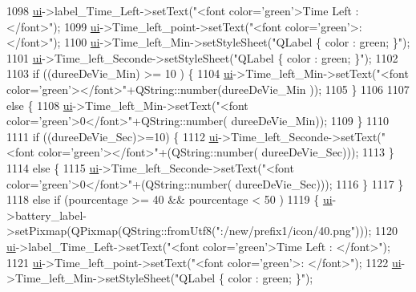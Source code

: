 \begin{DoxyCode}
{1098               \hyperlink{a00008_a6dc041ef6a2ffb329928d2913e8344e6}{ui}->label\_Time\_Left->setText(\textcolor{stringliteral}{"<font color='green'>Time Left : </font>"});
1099               \hyperlink{a00008_a6dc041ef6a2ffb329928d2913e8344e6}{ui}->Time\_left\_point->setText(\textcolor{stringliteral}{"<font color='green'>: </font>"});
1100               \hyperlink{a00008_a6dc041ef6a2ffb329928d2913e8344e6}{ui}->Time\_left\_Min->setStyleSheet(\textcolor{stringliteral}{"QLabel \{ color : green; \}"});
1101               \hyperlink{a00008_a6dc041ef6a2ffb329928d2913e8344e6}{ui}->Time\_left\_Seconde->setStyleSheet(\textcolor{stringliteral}{"QLabel \{ color : green; \}"});
1102 
1103               \textcolor{keywordflow}{if} ((dureeDeVie\_Min) >=  10 ) \{
1104                   \hyperlink{a00008_a6dc041ef6a2ffb329928d2913e8344e6}{ui}->Time\_left\_Min->setText(\textcolor{stringliteral}{"<font color='green'></font>"}+QString::number(dureeDeVie\_Min
      ));
1105               \}
1106 
1107               \textcolor{keywordflow}{else} \{
1108                   \hyperlink{a00008_a6dc041ef6a2ffb329928d2913e8344e6}{ui}->Time\_left\_Min->setText(\textcolor{stringliteral}{"<font color='green'>0</font>"}+QString::number(
      dureeDeVie\_Min));
1109               \}
1110 
1111               \textcolor{keywordflow}{if} ((dureeDeVie\_Sec)>=10) \{
1112                   \hyperlink{a00008_a6dc041ef6a2ffb329928d2913e8344e6}{ui}->Time\_left\_Seconde->setText(\textcolor{stringliteral}{"<font color='green'></font>"}+(QString::number(
      dureeDeVie\_Sec)));
1113               \}
1114               \textcolor{keywordflow}{else} \{
1115                   \hyperlink{a00008_a6dc041ef6a2ffb329928d2913e8344e6}{ui}->Time\_left\_Seconde->setText(\textcolor{stringliteral}{"<font color='green'>0</font>"}+(QString::number(
      dureeDeVie\_Sec)));
1116               \}
1117          \}
1118           \textcolor{keywordflow}{else} \textcolor{keywordflow}{if} (pourcentage >= 40 && pourcentage < 50 )
1119           \{   \hyperlink{a00008_a6dc041ef6a2ffb329928d2913e8344e6}{ui}->battery\_label->setPixmap(QPixmap(QString::fromUtf8(\textcolor{stringliteral}{":/new/prefix1/icon/40.png"})));
1120               \hyperlink{a00008_a6dc041ef6a2ffb329928d2913e8344e6}{ui}->label\_Time\_Left->setText(\textcolor{stringliteral}{"<font color='green'>Time Left : </font>"});
1121               \hyperlink{a00008_a6dc041ef6a2ffb329928d2913e8344e6}{ui}->Time\_left\_point->setText(\textcolor{stringliteral}{"<font color='green'>: </font>"});
1122               \hyperlink{a00008_a6dc041ef6a2ffb329928d2913e8344e6}{ui}->Time\_left\_Min->setStyleSheet(\textcolor{stringliteral}{"QLabel \{ color : green; \}"});
}
\end{DoxyCode}
